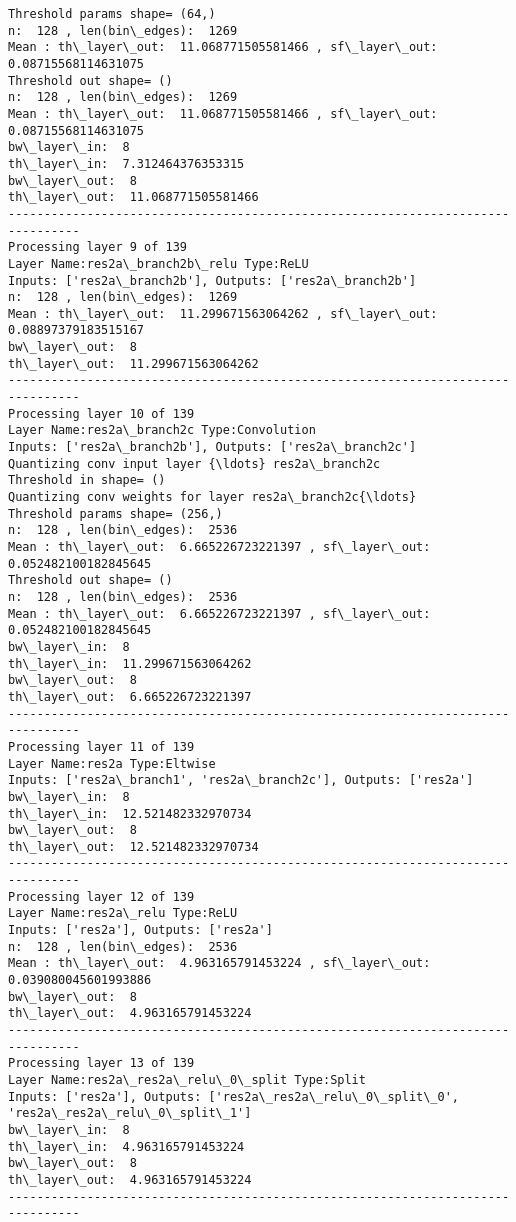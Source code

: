 \documentclass[11pt]{article}
\begin{document}
\begin{Verbatim}[commandchars=\\\{\}]
Threshold params shape= (64,)
n:  128 , len(bin\_edges):  1269
Mean : th\_layer\_out:  11.068771505581466 , sf\_layer\_out:  0.08715568114631075
Threshold out shape= ()
n:  128 , len(bin\_edges):  1269
Mean : th\_layer\_out:  11.068771505581466 , sf\_layer\_out:  0.08715568114631075
bw\_layer\_in:  8
th\_layer\_in:  7.312464376353315
bw\_layer\_out:  8
th\_layer\_out:  11.068771505581466
--------------------------------------------------------------------------------
Processing layer 9 of 139
Layer Name:res2a\_branch2b\_relu Type:ReLU
Inputs: ['res2a\_branch2b'], Outputs: ['res2a\_branch2b']
n:  128 , len(bin\_edges):  1269
Mean : th\_layer\_out:  11.299671563064262 , sf\_layer\_out:  0.08897379183515167
bw\_layer\_out:  8
th\_layer\_out:  11.299671563064262
--------------------------------------------------------------------------------
Processing layer 10 of 139
Layer Name:res2a\_branch2c Type:Convolution
Inputs: ['res2a\_branch2b'], Outputs: ['res2a\_branch2c']
Quantizing conv input layer {\ldots} res2a\_branch2c
Threshold in shape= ()
Quantizing conv weights for layer res2a\_branch2c{\ldots}
Threshold params shape= (256,)
n:  128 , len(bin\_edges):  2536
Mean : th\_layer\_out:  6.665226723221397 , sf\_layer\_out:  0.052482100182845645
Threshold out shape= ()
n:  128 , len(bin\_edges):  2536
Mean : th\_layer\_out:  6.665226723221397 , sf\_layer\_out:  0.052482100182845645
bw\_layer\_in:  8
th\_layer\_in:  11.299671563064262
bw\_layer\_out:  8
th\_layer\_out:  6.665226723221397
--------------------------------------------------------------------------------
Processing layer 11 of 139
Layer Name:res2a Type:Eltwise
Inputs: ['res2a\_branch1', 'res2a\_branch2c'], Outputs: ['res2a']
bw\_layer\_in:  8
th\_layer\_in:  12.521482332970734
bw\_layer\_out:  8
th\_layer\_out:  12.521482332970734
--------------------------------------------------------------------------------
Processing layer 12 of 139
Layer Name:res2a\_relu Type:ReLU
Inputs: ['res2a'], Outputs: ['res2a']
n:  128 , len(bin\_edges):  2536
Mean : th\_layer\_out:  4.963165791453224 , sf\_layer\_out:  0.039080045601993886
bw\_layer\_out:  8
th\_layer\_out:  4.963165791453224
--------------------------------------------------------------------------------
Processing layer 13 of 139
Layer Name:res2a\_res2a\_relu\_0\_split Type:Split
Inputs: ['res2a'], Outputs: ['res2a\_res2a\_relu\_0\_split\_0', 'res2a\_res2a\_relu\_0\_split\_1']
bw\_layer\_in:  8
th\_layer\_in:  4.963165791453224
bw\_layer\_out:  8
th\_layer\_out:  4.963165791453224
--------------------------------------------------------------------------------

\end{Verbatim}
\end{document}
